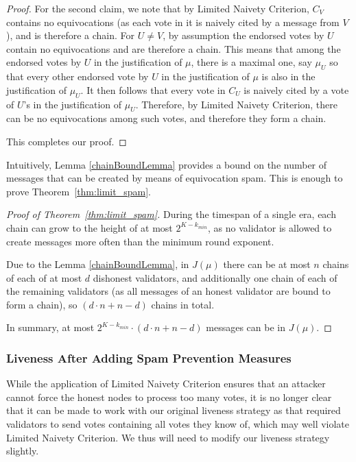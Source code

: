 \documentclass[12pt, fleqn]{article}
\begin{document}
\begin{proof}
For the second claim, we note that by Limited Naivety Criterion, $C_V$ contains no equivocations (as each vote in it is naively cited by a message from $V$), and is therefore a chain. For $U \neq V$, by assumption the endorsed votes by $U$ contain no equivocations and are therefore a chain. This means that among the endorsed votes by $U$ in the justification of $\mu$, there is a maximal one, say $\mu_U$ so that every other endorsed vote by $U$ in the justification of $\mu$ is also in the justification of $\mu_U$. It then follows that every vote in $C_U$ is naively cited by a vote of $U$'s in the justification of $\mu_U$. Therefore, by Limited Naivety Criterion, there can be no equivocations among such votes, and therefore they form a chain.

This completes our proof.
\end{proof}


Intuitively, Lemma \ref{chainBoundLemma} provides a bound on the number of messages that can be created by means of equivocation spam. This is enough to prove Theorem~\ref{thm:limit_spam}.




\begin{proof}[Proof of Theorem~\ref{thm:limit_spam}]
During the timespan of a single era, each chain can grow to the height of at most $2^{K-k_{min}}$, as no validator is allowed to create messages more often than the minimum round exponent.

Due to the Lemma \ref{chainBoundLemma}, in $J(\mu)$ there can be at most $n$ chains of each of at most $d$ dishonest validators, and additionally one chain of each of the remaining validators (as all messages of an honest validator are bound to form a chain), so $(d\cdot n + n-d)$ chains in total.

In summary, at most $2^{K-k_{min}}\cdot (d\cdot n + n-d)$ messages can be in $J(\mu)$. 

\end{proof}

\subsubsection{Liveness After Adding Spam Prevention Measures}

While the application of Limited Naivety Criterion ensures that an attacker cannot force the honest nodes to process too many votes, it is no longer clear that it can be made to work with our original liveness strategy as that required validators to send votes containing all votes they know of, which may well violate Limited Naivety Criterion. We thus will need to modify our liveness strategy slightly.
\end{document}

